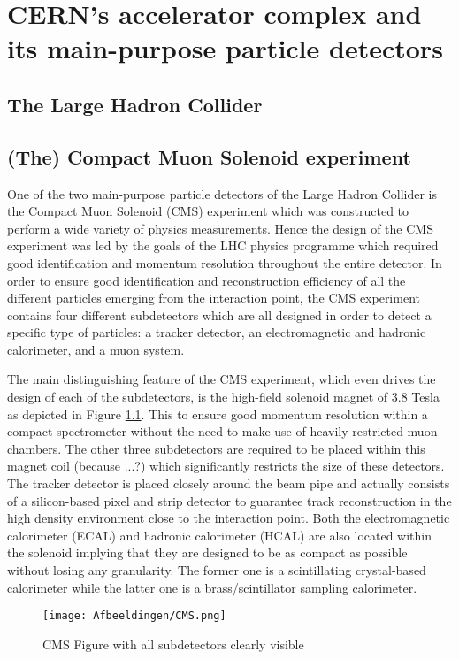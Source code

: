 \chapter{CERN's accelerator complex and its main-purpose particle detectors} \label{chp:labelTitle}

\section{The Large Hadron Collider}

\section{(The) Compact Muon Solenoid experiment} 

One of the two main-purpose particle detectors of the Large Hadron Collider is the Compact Muon Solenoid (CMS) experiment which was constructed to perform a wide variety of physics measurements. Hence the design of the CMS experiment was led by the goals of the LHC physics programme which required good identification and momentum resolution throughout the entire detector.
In order to ensure good identification and reconstruction efficiency of all the different particles emerging from the interaction point, the CMS experiment contains four different subdetectors which are all designed in order to detect a specific type of particles: a tracker detector, an electromagnetic and hadronic calorimeter, and a muon system.

The main distinguishing feature of the CMS experiment, which even drives the design of each of the subdetectors, is the high-field solenoid magnet of $3.8$ Tesla as depicted in Figure \ref{fig::CMSFig}. This to ensure good momentum resolution within a compact spectrometer without the need to make use of heavily restricted muon chambers. The other three subdetectors are required to be placed within this magnet coil (because ...?) which significantly restricts the size of these detectors. The tracker detector is placed closely around the beam pipe and actually consists of a silicon-based pixel and strip detector to guarantee track reconstruction in the high density environment close to the interaction point. Both the electromagnetic calorimeter (ECAL) and hadronic calorimeter (HCAL) are also located within the solenoid implying that they are designed to be as compact as possible without losing any granularity. The former one is a scintillating crystal-based calorimeter while the latter one is a brass/scintillator sampling calorimeter.
\begin{figure}[h!t]
 \centering
 \texttt{[image: Afbeeldingen/CMS.png]}
 \caption{CMS Figure with all subdetectors clearly visible} \label{fig::CMSFig}
\end{figure}

